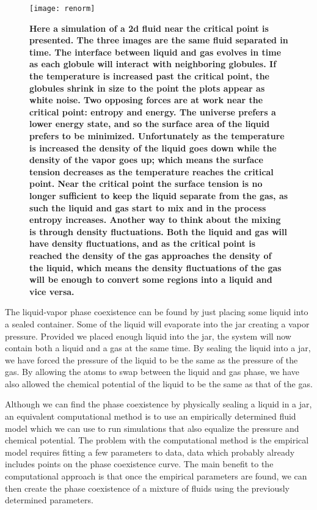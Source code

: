 ﻿%
\begin{figure}[h]
\vspace*{-5mm}
\hspace*{-6mm}
	\centering
	\texttt{[image: renorm]}
	\caption{
	\scriptsize
	\textbf{Here a simulation of a 2d fluid near the critical point is presented. The three images are the same fluid separated in time. The interface between liquid and gas evolves in time as each globule will interact with neighboring globules. If the temperature is increased past the critical point, the globules shrink in size to the point the plots appear as white noise. Two opposing forces are at work near the critical point: entropy and energy. The universe prefers a lower energy state, and so the surface area of the liquid prefers to be minimized. Unfortunately as the temperature is increased the density of the liquid goes down while the density of the vapor goes up; which means the surface tension decreases as the temperature reaches the critical point. Near the critical point the surface tension is no longer sufficient to keep the liquid separate from the gas, as such the liquid and gas start to mix and in the process entropy increases. 
Another way to think about the mixing is through density fluctuations. Both the liquid and gas will have density fluctuations, and as the critical point is reached the density of the gas approaches the density of the liquid, which means the density fluctuations of the gas will be enough to convert some regions into a liquid and vice versa.}}
	\label{fig:renorm}
\end{figure}
\vspace*{-2mm}
The liquid-vapor phase coexistence can be found by just placing some liquid into a sealed container. Some of the liquid will evaporate into the jar creating a vapor pressure. Provided we placed enough liquid into the jar, the system will now contain both a liquid and a gas at the same time. By sealing the liquid into a jar, we have forced the pressure of the liquid to be the same as the pressure of the gas. By allowing the atoms to swap between the liquid and gas phase, we have also allowed the chemical potential of the liquid to be the same as that of the gas.

Although we can find the phase coexistence by physically sealing a liquid in a jar, an equivalent computational method is to use an empirically determined fluid model which we can use to run simulations that also equalize the pressure and chemical potential. The problem with the computational method is the empirical model requires fitting a few parameters to data, data which probably already includes points on the phase coexistence curve. The main benefit to the computational approach is that once the empirical parameters are found, we can then create the phase coexistence of a mixture of fluids using the previously determined parameters.

